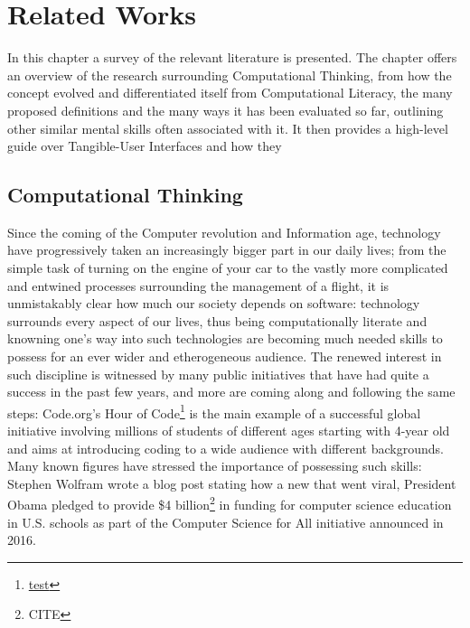%
\chapter{Related Works}\label{sec:related}


In this chapter a survey of the relevant literature is presented. The chapter offers an overview of the research surrounding Computational Thinking, from how the concept evolved and differentiated itself from Computational Literacy, the many proposed definitions and the many ways it has been evaluated so far, outlining other similar mental skills often associated with it. It then provides a high-level guide over Tangible-User Interfaces and how they 

\section{Computational Thinking} %
Since the coming of the Computer revolution and Information age, technology have progressively taken an increasingly bigger part in our daily lives; from the simple task of turning on the engine of your car to the vastly more complicated and entwined processes surrounding the management of a flight, it is unmistakably clear how much our society depends on software: technology surrounds every aspect of our lives, thus being computationally literate and knowning one's way into such technologies are becoming much needed skills to possess for an ever wider and etherogeneous audience. The renewed interest in such discipline is witnessed by many public initiatives that have had quite a success in the past few years, and more are coming along and following the same steps: Code.org’s Hour of Code\footnote{\url{test}} is the main example of a successful global initiative involving millions of students of different ages starting with 4-year old and aims at introducing coding to a wide audience with different backgrounds. Many known figures have stressed the importance of possessing such skills: Stephen Wolfram wrote a blog post stating how \TODO a new that went viral, President Obama pledged to provide \$4 billion\footnote{CITE} in funding for computer science education in U.S. schools as part of the Computer Science for All initiative announced in 2016.

